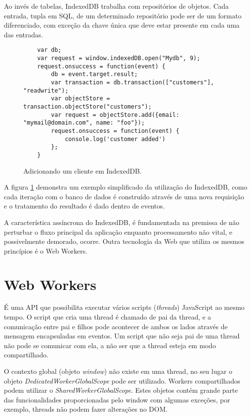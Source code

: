 Ao invés de tabelas, IndexedDB trabalha com repositórios de objetos.
Cada entrada, tupla em SQL, de um determinado repositório pode ser de
um formato diferenciado, com exceção da chave única que deve estar
presente em cada uma das entradas.

\begin{figure}[H]
\centering
\begin{verbatim}
	var db;
	var request = window.indexedDB.open("Mydb", 9);
	request.onsuccess = function(event) {
		db = event.target.result;
		var transaction = db.transaction(["customers"], "readwrite");
		var objectStore = transaction.objectStore("customers");
		var request = objectStore.add({email: "mymail@domain.com", name: "foo"});
		request.onsuccess = function(event) {
			console.log('customer added')
		};
	}
\end{verbatim}
\caption{Adicionando um cliente em IndexedDB.}
\label{fig:IndexedDB}
\end{figure}

A figura \ref{fig:IndexedDB} demonstra um exemplo simplificado da
utilização do IndexedDB, como cada iteração com o banco de dados é
construído através de uma nova requisição e o tratamento do resultado
é dado dentro de eventos.


A característica assíncrona do IndexedDB, é fundamentada na
premissa de não perturbar o fluxo principal da aplicação enquanto
processamento não vital, e possivelmente demorado, ocorre. Outra
tecnologia da Web que utiliza os mesmos princípios é o Web Workers.

\section{Web Workers}

É uma API que possibilita executar vários scripts
(\textit{threads}) JavaScript ao mesmo tempo. O script que cria uma
thread é chamado de pai da thread, e a comunicação entre pai e filhos
pode acontecer de ambos os lados através de mensagem encapsuladas
em eventos. Um script que não seja pai de uma thread não pode se
comunicar com ela, a não ser que a thread esteja em modo compartilhado.

O contexto global (objeto \textit{window}) não existe em uma
thread, no seu lugar o objeto \textit{DedicatedWorkerGlobalScope}
pode ser utilizado. Workers compartilhados podem utilizar o
\textit{SharedWorkerGlobalScope}. Estes objetos contém grande parte das
funcionalidades proporcionadas pelo window com algumas exceções, por
exemplo, threads não podem fazer alterações no DOM.

